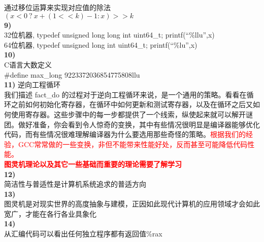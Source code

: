 \documentclass{article}
\newcommand{\red}[1]{\textcolor{red}{#1}}
\begin{document}
\begin{CJK}{UTF8}{uyhei}
通过移位运算来实现对应值的除法	\\
$(x<0\ ?\ x+(1<<k)-1 : x) >> k$	\\[1ex]
\newpage
\noindent\textbf{9)}	\\
32位机器, typedef unsigned long long int uint64\_t; printf(``\%llu'',x)	\\
64位机器, typedef unsigned long int uint64\_t; printf(``\%lu'',x)	\\
\textbf{10)}	\\
C语言大数定义	\\
\#define max\_long 9223372036854775808llu	\\
\textbf{11)}
逆向工程循环	\\
我们描述 fact\_do 的过程对于逆向工程循环来说，是一个通用的策略。看看在循环之前如何初始化寄存器，在循环中如何更新和测试寄存器，以及在循环之后又如何使用寄存器。这些步骤中的每一步都提供了一个线索，纵使起来就可以解开谜团。做好准备，你会看到令人惊奇的变换，其中有些情况很明显是编译器能够优化代码，而有些情况很难理解编译器为什么要选用那些奇怪的策略。\red{根据我们的经验，GCC常常做的一些变换，非但不能带来性能好处，反而甚至可能降低代码性能。}	\\[2ex]
\textbf{\red{ 图灵机理论以及其它一些基础而重要的理论需要了解学习 }}	\\
\textbf{12)}	\\
简洁性与普适性是计算机系统追求的普适方向	\\
\textbf{13)}	\\
图灵机是对现实世界的高度抽象与建模，正因如此现代计算机的应用领域才会如此宽广，才能在各行各业具象化	\\
\textbf{14)}	\\
从汇编代码可以看出任何独立程序都有返回值\%rax	\\[2ex]




\end{CJK}
\end{document}
